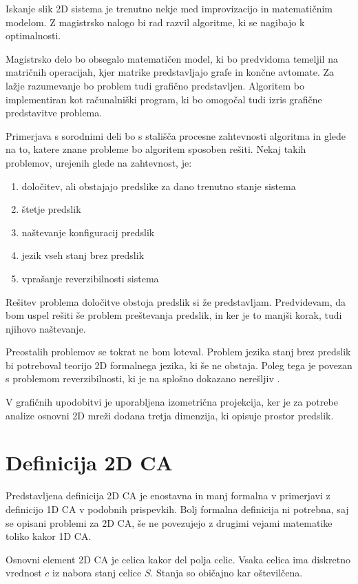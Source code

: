 \documentclass[12pt,a4paper,openany,twoside]{book}
\begin{document}
Iskanje slik 2D sistema je trenutno nekje med improvizacijo in matematičnim modelom.
Z magistrsko nalogo bi rad razvil algoritme, ki se nagibajo k optimalnosti.

Magistrsko delo bo obsegalo matematičen model, ki bo predvidoma temeljil na matričnih operacijah,
kjer matrike predstavljajo grafe in končne avtomate.
Za lažje razumevanje bo problem tudi grafično predstavljen.
Algoritem bo implementiran kot računalniški program,
ki bo omogočal tudi izris grafične predstavitve problema.

Primerjava s sorodnimi deli bo s stališča procesne zahtevnosti algoritma in glede na to,
katere znane probleme bo algoritem sposoben rešiti. Nekaj takih problemov, urejenih glede na zahtevnost, je:
\begin{enumerate}
\item določitev, ali obstajajo predslike za dano trenutno stanje sistema
\item štetje predslik
\item naštevanje konfiguracij predslik
\item jezik vseh stanj brez predslik
\item vprašanje reverzibilnosti sistema
\end{enumerate}

Rešitev problema določitve obstoja predslik si že predstavljam. 
Predvidevam, da bom uspel rešiti še problem preštevanja predslik,
in ker je to manjši korak, tudi njihovo naštevanje.

Preostalih problemov se tokrat ne bom loteval.
Problem jezika stanj brez predslik bi potreboval teorijo 2D formalnega jezika, ki še ne obstaja.
Poleg tega je povezan s problemom reverzibilnosti, ki je na splošno dokazano nerešljiv \cite{Kari1989}.

V grafičnih upodobitvi je uporabljena izometrična projekcija,
ker je za potrebe analize osnovni 2D mreži dodana tretja dimenzija,
ki opisuje prostor predslik.

\chapter{Definicija 2D CA}

Predstavljena definicija 2D CA je enostavna in manj formalna
v primerjavi z definicijo 1D CA v podobnih prispevkih.
Bolj formalna definicija ni potrebna, saj se opisani problemi za 2D CA,
še ne povezujejo z drugimi vejami matematike toliko kakor 1D CA.

Osnovni element 2D CA je celica kakor del polja celic.
Vsaka celica ima diskretno vrednost \(c\) iz nabora stanj celice \(S\).
Stanja so običajno kar oštevilčena.
\end{document}
